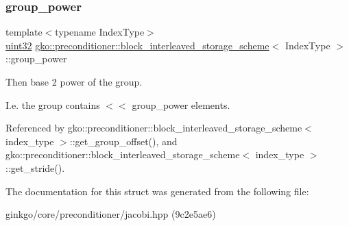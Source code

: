 \subsubsection{\texorpdfstring{group\+\_\+power}{group\_power}}
{\footnotesize\ttfamily template$<$typename Index\+Type$>$ \\
\hyperlink{namespacegko_a318c831e3fe269ba04c6ed8bf5a71073}{uint32} \hyperlink{structgko_1_1preconditioner_1_1block__interleaved__storage__scheme}{gko\+::preconditioner\+::block\+\_\+interleaved\+\_\+storage\+\_\+scheme}$<$ Index\+Type $>$\+::group\+\_\+power}



Then base 2 power of the group. 

I.\+e. the group contains { $<$$<$ group\+\_\+power} elements. 

Referenced by gko\+::preconditioner\+::block\+\_\+interleaved\+\_\+storage\+\_\+scheme$<$ index\+\_\+type $>$\+::get\+\_\+group\+\_\+offset(), and gko\+::preconditioner\+::block\+\_\+interleaved\+\_\+storage\+\_\+scheme$<$ index\+\_\+type $>$\+::get\+\_\+stride().



The documentation for this struct was generated from the following file\+:\begin{DoxyCompactItemize}
\item 
ginkgo/core/preconditioner/jacobi.\+hpp (9c2e5ae6)\end{DoxyCompactItemize}
